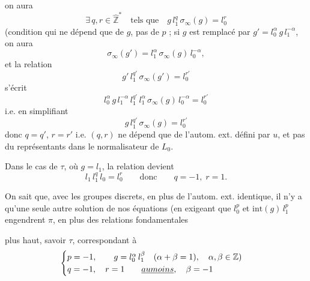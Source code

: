 \documentclass[11pt,a4paper]{article}
\begin{document}


on aura
\[
\exists\, q, r \in \hat{\mathbb{Z}}^{*} \quad \text{tels que} \quad
\boxed{g\, l_1^{q}\, \sigma_\infty(g) = l_0^{r}}
\]
(condition qui ne dépend que de $g$, pas de $p$ ; si $g$ est remplacé par
$g' = l_0^{\alpha}\, g\, l_1^{-\alpha}$, on aura
\[
\sigma_\infty(g') = l_1^{\alpha}\, \sigma_\infty(g)\, l_0^{-\alpha},
\]
et la relation
\[
g'\, l_1^{q'}\, \sigma_\infty(g') = l_0^{r'}
\]
s'écrit
\[
l_0^{\alpha}\, g\, l_1^{-\alpha}\, l_1^{q'}\, l_1^{\alpha}\, \sigma_\infty(g)\, l_0^{-\alpha} = l_0^{r'}
\]
i.e. en simplifiant
\[
g\, l_1^{q'}\, \sigma_\infty(g) = l_0^{r'}
\]
donc $q = q'$, $r = r'$ i.e. $(q, r)$ ne dépend que de l'autom. ext. défini
par $u$, et pas du   représentants dans le
normalisateur de $L_0$.




Dans le cas de $\tau$, où $g = l_1$, la relation devient
\[
l_1\, l_1^{q}\, l_0 = l_0^{r} \qquad \text{donc} \qquad q = -1,\; r = 1 .
\]

On sait que,  avec les groupes discrets, en plus de
l'autom. ext. identique, il n'y a qu'une seule autre solution de nos
équations (en exigeant  que $l_0^{p}$ et
$\mathrm{int}(g)\, l_1^{p}$ engendrent $\pi$, en plus des relations
fondamentales

plus haut, \struck{\ill{}} savoir $\tau$, correspondant \struck{\ill{}} à
\[
\begin{cases}
p = -1, \qquad g = l_0^{\alpha}\, l_1^{\beta} \quad (\alpha + \beta = 1), \quad \alpha, \beta \in \mathbb{Z}) \\
q = -1, \quad r = 1 \qquad \uncertain{au moins}, \quad \beta = -1
\end{cases}
\]

\end{document}
